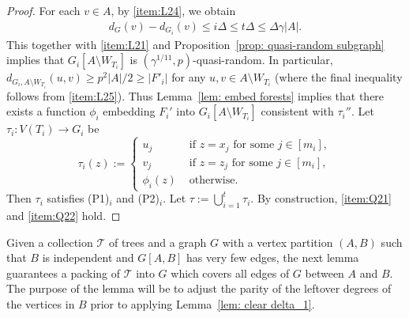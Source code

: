 \documentclass[a4paper, 11pt, reqno]{amsart}
\numberwithin{equation}{section}
\newcommand{\1}{{\rm 1\hspace*{-0.4ex}%
\rule{0.1ex}{1.52ex}\hspace*{0.2ex}}}
\newcommand{\cT}{\mathcal{T}}
\newcommand{\sm}{\setminus}
\begin{document}
\begin{proof}
For each $v\in A$, by \ref{item:L24}, we obtain
\begin{align*}
d_{G}(v)-d_{G_i}(v) \leq i \Delta \leq t\Delta \leq \Delta\gamma |A|.
\end{align*}
This together with \ref{item:L21} and Proposition~\ref{prop: quasi-random subgraph} implies that $G_i[A \sm W_{T_i}]$ is $(\gamma^{1/11},p)$-quasi-random. 
In particular, $d_{G_i,A\sm W_{T_i}}(u,v) \geq p^2|A|/2 \geq |F'_i| $ for any $u,v\in A\sm W_{T_i}$
(where the final inequality follows from \ref{item:L25}). 
Thus Lemma~\ref{lem: embed forests} implies that there exists a function $\phi_i$ embedding $F_i'$ into $G_i[A \sm W_{T_i}]$
consistent with $\tau_i''$.
Let $\tau_i: V(T_i) \to G_i$ be 
$$\tau_{i}(z):=
\left\{\begin{array}{ll} u_j &\text{ if } z=x_j \text{ for some }j\in[m_i],\\
v_j &\text{ if } z=z_j \text{ for some }j\in[m_i],\\
\phi_i(z) &\text{ otherwise.}\end{array} \right.$$ 
Then $\tau_i$ satisfies (P1)$_i$ and (P2)$_i$.
Let $\tau:=\bigcup_{i=1}^{t} \tau_i.$ By construction, \ref{item:Q21} and \ref{item:Q22} hold.
\end{proof}


Given a collection $\cT$ of trees and a graph $G$ with a vertex partition $(A,B)$
such that $B$ is independent
and $G[A,B]$ has very few edges, 
the next lemma guarantees a packing of $\cT$ into $G$ which covers all edges of $G$ between $A$ and $B$. The purpose of the lemma will be to adjust the parity of the leftover degrees of the vertices in $B$ prior to applying Lemma~\ref{lem: clear delta_1}.
\end{document}
